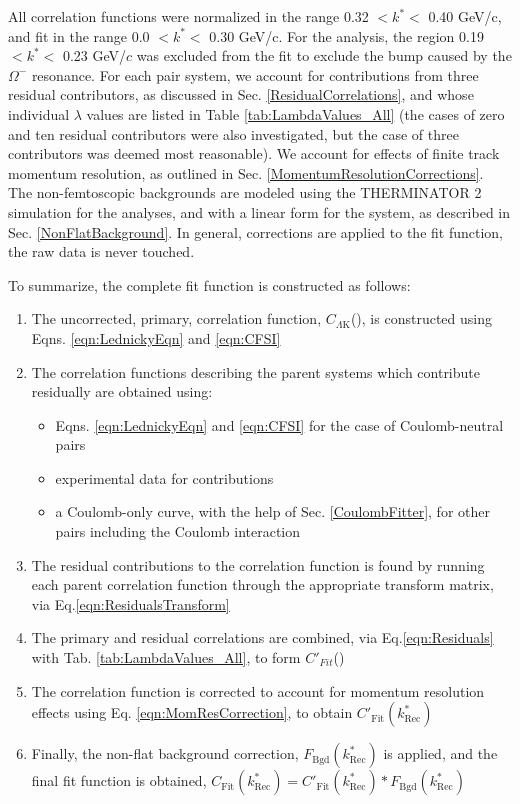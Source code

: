 \documentclass[/home/jesse/Analysis/FemtoAnalysis/AnalysisNotes/AnalysisNoteJBuxton.tex]{subfiles}
\begin{document}
All correlation functions were normalized in the range 0.32 $< k^{*} <$ 0.40 GeV/c, and fit in the range 0.0 $< k^{*} <$ 0.30 GeV/c.
For the \LamKchM analysis, the region 0.19 $< k^{*} <$ 0.23 GeV/$c$ was excluded from the fit to exclude the bump caused by the $\Omega^{-}$ resonance.
For each pair system, we account for contributions from three residual contributors, as discussed in Sec. \ref{ResidualCorrelations}, and whose individual $\lambda$ values are listed in Table \ref{tab:LambdaValues_All} (the cases of zero and ten residual contributors were also investigated, but the case of three contributors was deemed most reasonable).
We account for effects of finite track momentum resolution, as outlined in Sec. \ref{MomentumResolutionCorrections}.
The non-femtoscopic backgrounds are modeled using the THERMINATOR 2 simulation for the \LamKpm analyses, and with a linear form for the \LamKs system, as described in Sec. \ref{NonFlatBackground}.
In general, corrections are applied to the fit function, the raw data is never touched.

To summarize, the complete fit function is constructed as follows:
\begin{enumerate}
 \item The uncorrected, primary, correlation function, $C_{\Lambda\mathrm{K}}$(\ktrue), is constructed using Eqns. \ref{eqn:LednickyEqn} and \ref{eqn:CFSI}
 \item The correlation functions describing the parent systems which contribute residually are obtained using:
 \begin{itemize}
  \item Eqns. \ref{eqn:LednickyEqn} and \ref{eqn:CFSI} for the case of Coulomb-neutral pairs
  \item \XiKpm experimental data for \XiKpm contributions
  \item a Coulomb-only curve, with the help of Sec. \ref{CoulombFitter}, for other pairs including the Coulomb interaction 
 \end{itemize} 
 \item The residual contributions to the \LamK correlation function is found by running each parent correlation function through the appropriate transform matrix, via Eq.\ref{eqn:ResidualsTransform}
 \item The primary and residual correlations are combined, via Eq.\ref{eqn:Residuals} with Tab. \ref{tab:LambdaValues_All}, to form $C'_{Fit}$(\ktrue)
 \item The correlation function is corrected to account for momentum resolution effects using Eq. \ref{eqn:MomResCorrection}, to obtain $C'_{\mathrm{Fit}}(k^{*}_{\mathrm{Rec}})$
 \item Finally, the non-flat background correction, $F_{\mathrm{Bgd}}(k^{*}_{\mathrm{Rec}})$ is applied, and the final fit function is obtained, $C_{\mathrm{Fit}}(k^{*}_{\mathrm{Rec}}) = C'_{\mathrm{Fit}}(k^{*}_{\mathrm{Rec}})*F_{\mathrm{Bgd}}(k^{*}_{\mathrm{Rec}})$
\end{enumerate}
\end{document}

